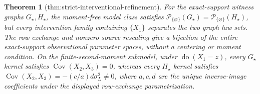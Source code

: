 \documentclass{article}
\newtheorem{theorem}{Theorem}
\begin{document}
\begin{theorem}[thm:strict-interventional-refinement]\label{thm:strict-interventional-refinement}
For the exact-support witness graphs \(G_\star,H_\star\), the moment-free model class satisfies \(\mathcal P_{\{\varnothing\}}(G_\star)=\mathcal P_{\{\varnothing\}}(H_\star)\), but every intervention family containing \(\{X_1\}\) separates the two graph law sets.  The row exchange and nonzero source rescaling give a bijection of the entire exact-support observational parameter spaces, without a centering or moment condition.  On the finite-second-moment submodel, under \(\operatorname{do}(X_1=z)\), every \(G_\star\) kernel satisfies \(\operatorname{Cov}(X_2,X_3)=0\), whereas every \(H_\star\) kernel satisfies \(\operatorname{Cov}(X_2,X_3)=-(c/a)d\sigma_L^2\ne0\), where \(a,c,d\) are the unique inverse-image coefficients under the displayed row-exchange parametrization.
\end{theorem}
\end{document}
